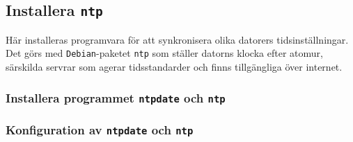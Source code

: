 \subsection{Installera \texttt{ntp}}
Här installeras programvara för att synkronisera olika datorers
tidsinställningar.  Det görs med \texttt{Debian}-paketet \texttt{ntp} som
ställer datorns klocka efter atomur, särskilda servrar som agerar
tidsstandarder och finns tillgängliga över internet.

\subsubsection{Installera programmet \texttt{ntpdate} och \texttt{ntp}}

\subsubsection{Konfiguration av \texttt{ntpdate} och \texttt{ntp}}
%


